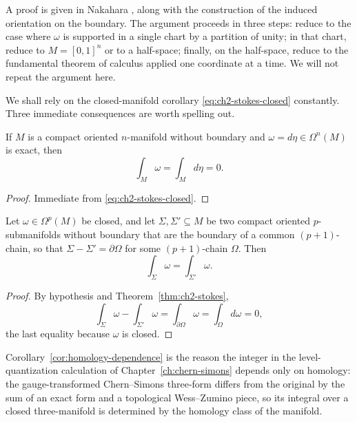 A proof is given in Nakahara \cite{Nakahara2003GTP}, along with the construction of the induced orientation on the boundary. The argument proceeds in three steps: reduce to the case where $\omega$ is supported in a single chart by a partition of unity; in that chart, reduce to $M = [0, 1]^n$ or to a half-space; finally, on the half-space, reduce to the fundamental theorem of calculus applied one coordinate at a time. We will not repeat the argument here.

\medskip

\noindent We shall rely on the closed-manifold corollary \eqref{eq:ch2-stokes-closed} constantly. Three immediate consequences are worth spelling out.

\begin{corollary}\label{cor:exact-to-zero}
If $M$ is a compact oriented $n$-manifold without boundary and $\omega = d\eta \in \Omega^n(M)$ is exact, then
\begin{equation*}
\int_M \omega = \int_M d\eta = 0.
\end{equation*}
\end{corollary}

\begin{proof}
Immediate from \eqref{eq:ch2-stokes-closed}.
\end{proof}

\begin{corollary}\label{cor:homology-dependence}
Let $\omega \in \Omega^p(M)$ be closed, and let $\Sigma, \Sigma' \subseteq M$ be two compact oriented $p$-submanifolds without boundary that are the boundary of a common $(p+1)$-chain, so that $\Sigma - \Sigma' = \partial \Omega$ for some $(p+1)$-chain $\Omega$. Then
\begin{equation*}
\int_\Sigma \omega = \int_{\Sigma'} \omega.
\end{equation*}
\end{corollary}

\begin{proof}
By hypothesis and Theorem~\ref{thm:ch2-stokes},
\begin{equation*}
\int_\Sigma \omega - \int_{\Sigma'} \omega = \int_{\partial \Omega} \omega = \int_\Omega d\omega = 0,
\end{equation*}
the last equality because $\omega$ is closed.
\end{proof}

\noindent Corollary~\ref{cor:homology-dependence} is the reason the integer in the level-quantization calculation of Chapter~\ref{ch:chern-simons} depends only on homology: the gauge-transformed Chern--Simons three-form differs from the original by the sum of an exact form and a topological Wess--Zumino piece, so its integral over a closed three-manifold is determined by the homology class of the manifold.

